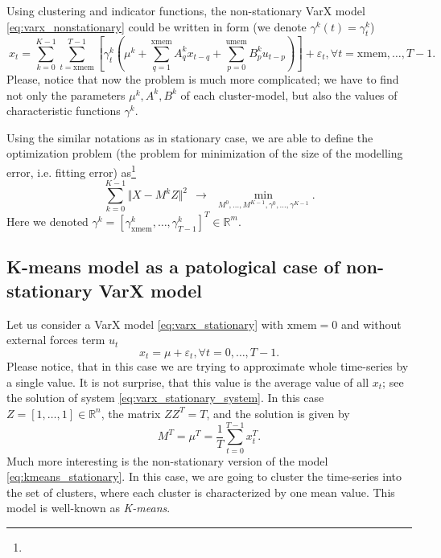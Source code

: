  Using clustering and indicator functions, the non-stationary VarX model \eqref{eq:varx_nonstationary} could be written in form (we denote $\gamma^k(t) = \gamma^k_t$)
 \begin{equation}
  \label{eq:varx_nonstationary_gamma}
   \
	x_t = 
	\sum\limits_{k=0}^{K-1} 
	\sum\limits_{t=\mathrm{xmem}}^{T-1} 
	\left[
	 \gamma^k_t
	 \left( \mu^k + \sum\limits_{q=1}^{\mathrm{xmem}} A_q^k x_{t-q} + \sum\limits_{p=0}^{\mathrm{umem}} B_p^k u_{t-p} \right)
	\right] 
	+ \varepsilon_t, \forall t = \mathrm{xmem}, \dots, T-1.
 \end{equation}
 Please, notice that now the problem is much more complicated; we have to find not only the parameters $\mu^k, A^k,B^k$ of each cluster-model, but also the values of characteristic functions $\gamma^k$.

 Using the similar notations as in stationary case, we are able to define the optimization problem (the problem for minimization of the size of the modelling error, i.e. fitting error) as\footnote{} 
 \begin{displaymath}
  \label{eq:eq:varx_nonstationary_matrix_eps}
  \sum\limits_{k=0}^{K-1} \Vert X - M^k Z \Vert^2 ~~ \rightarrow ~~ \min\limits_{M^0,\dots,M^{K-1}, \gamma^{0}, \dots, \gamma^{K-1}}.
 \end{displaymath} 
 Here we denoted $\gamma^k = [\gamma^k_{\mathrm{xmem}}, \dots, \gamma^k_{T-1} ]^T \in \mathbb{R}^m$.
 
 \subsection {K-means model as a patological case of non-stationary VarX model}

 Let us consider a VarX model \eqref{eq:varx_stationary} with $\mathrm{xmem} = 0$ and without external forces term $u_t$
 \begin{equation}
  \label{eq:kmeans_stationary}
  x_t = \mu + \varepsilon_t, \forall t = 0,\dots,T-1.
 \end{equation}
 Please notice, that in this case we are trying to approximate whole time-series by a single value. It is not surprise, that this value is the average value of all $x_t$;
 see the solution of system \eqref{eq:varx_stationary_system}. In this case $Z = [1,\dots,1] \in \mathbb{R}^n$, the matrix $ZZ^T = T$, and the solution is given by
 \begin{displaymath}
  M^T = \mu^T = \frac{1}{T} \sum\limits_{t=0}^{T-1} x_t^T.
 \end{displaymath}
 Much more interesting is the non-stationary version of the model \eqref{eq:kmeans_stationary}. In this case, we are going to cluster the time-series into the set of clusters,
 where each cluster is characterized by one mean value. This model is well-known as \emph{K-means}.
